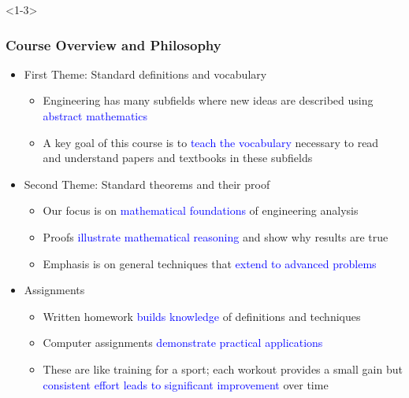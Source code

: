 \documentclass[10pt,english,aspectratio=169]{beamer}
\begin{document}
\begin{frame}<1-3> \frametitle{Course Overview and Philosophy}

\begin{itemize}
\item<1-> First Theme: Standard definitions and vocabulary \vspace{1mm}

\begin{itemize}
  \setlength\itemsep{1.5mm}
  \item Engineering has many subfields where new ideas are described using \textcolor{blue}{abstract mathematics}
  
  \item A key goal of this course is to \textcolor{blue}{teach the vocabulary} necessary to read \\ and understand papers and textbooks in these subfields \vspace{2mm}
\end{itemize}

\item<2-> Second Theme: Standard theorems and their proof \vspace{1mm}

\begin{itemize}
  \setlength\itemsep{1.5mm}
  \item Our focus is on \textcolor{blue}{mathematical foundations} of engineering analysis
  \item Proofs \textcolor{blue}{illustrate mathematical reasoning} and show why results are true
  \item Emphasis is on general techniques that \textcolor{blue}{extend to advanced problems}  \vspace{2mm}

\end{itemize}
\item<3->  Assignments \vspace{1mm}

\begin{itemize}
  \setlength\itemsep{2mm}
  \item Written homework \textcolor{blue}{builds knowledge} of definitions and techniques
  \item Computer assignments \textcolor{blue}{demonstrate practical applications}
  \item These are like training for a sport; each workout provides a small gain but \textcolor{blue}{consistent effort leads to significant improvement} over time


\end{itemize}
\end{itemize}
\end{frame}
\end{document}
